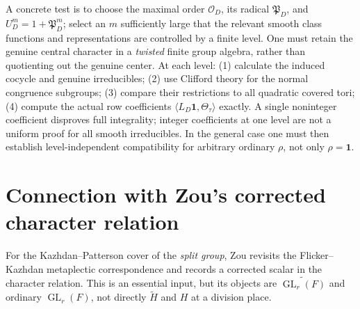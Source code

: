 \documentclass[11pt]{article}
\newcommand{\GL}{\operatorname{GL}}
\newcommand{\tH}{\widetilde H}
\theoremstyle{plain}
\theoremstyle{definition}
\begin{document}
A concrete test is to choose the maximal order $\mathcal O_D$,
its radical $\mathfrak P_D$, and
$U_D^m=1+\mathfrak P_D^m$; select an $m$ sufficiently large
that the relevant smooth class functions and representations
are controlled by a finite level.  One must retain the genuine
central character in a \emph{twisted} finite group algebra,
rather than quotienting out the genuine center.  At each level:
(1) calculate the induced cocycle and genuine irreducibles;
(2) use Clifford theory for the normal congruence subgroups;
(3) compare their restrictions to all quadratic covered tori;
(4) compute the actual row coefficients
$\langle L_D\mathbf1,\Theta_\tau\rangle$ exactly.
A single noninteger coefficient disproves full integrality;
integer coefficients at one level are not a uniform proof for
all smooth irreducibles.  In the general case one must then
establish level-independent compatibility for arbitrary
ordinary $\rho$, not only $\rho=\mathbf1$.
\section{Connection with Zou's corrected character relation}\label{sec:Zou}
For the Kazhdan--Patterson cover of the \emph{split group},
Zou \cite[\S3]{Zou24} revisits the Flicker--Kazhdan metaplectic
correspondence and records a corrected scalar in the character
relation.  This is an essential input, but its objects are
$\widetilde{\GL_r(F)}$ and ordinary $\GL_r(F)$, not directly
$\tH$ and $H$ at a division place.
\end{document}
